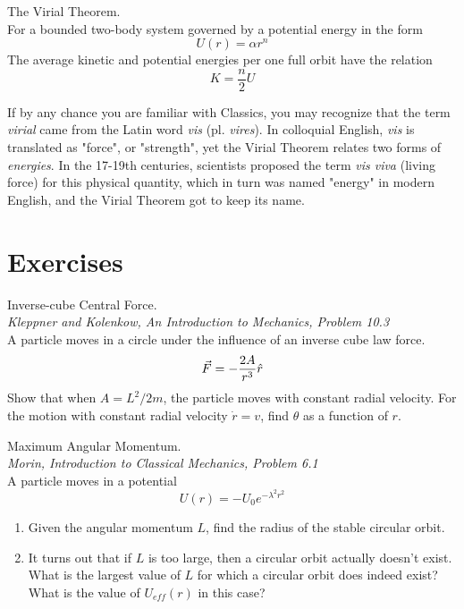 \documentclass[11pt]{article}
\theoremstyle{gangnamstyle}{\newtheorem{definition}{Definition}[]}
\theoremstyle{gangnamstyle}{\newtheorem{example}{Example}[]}
\theoremstyle{gangnamstyle}{\newtheorem{problem}{Problem}[]}
\theoremstyle{gangnamstyle}{\newtheorem{warning}{Warning}[]}
\begin{document}
\begin{definition}
The Virial Theorem. \\
For a bounded two-body system governed by a potential energy in the form
\begin{equation}
U(r) = \alpha r^n
\end{equation}
The average kinetic and potential energies per one full orbit have the relation
\begin{equation}
K = \frac{n}{2}U
\end{equation}
\end{definition}

If by any chance you are familiar with Classics, you may recognize that the term \textit{virial} came from the Latin word \textit{vis} (pl. \textit{vires}). In colloquial English, \textit{vis} is translated as "force", or "strength", yet the Virial Theorem relates two forms of \textit{energies}. In the 17-19th centuries, scientists proposed the term \textit{vis viva} (living force) for this physical quantity, which in turn was named "energy" in modern English, and the Virial Theorem got to keep its name. 

\pagebreak

\section{Exercises}

\begin{problem}
Inverse-cube Central Force. \\
\textit{Kleppner and Kolenkow, An Introduction to Mechanics, Problem 10.3} \\
A particle moves in a circle under the influence of an inverse cube law force.
\[ \Vec{F} = - \frac{2A}{r^3}\Hat{r} \]
Show that when $A = L^2 / 2m$, the particle moves with constant radial velocity. For the motion with constant radial velocity $\Dot{r} = v$, find $\theta$ as a function of $r$. 
\end{problem}

\begin{problem}
Maximum Angular Momentum. \\
\textit{Morin, Introduction to Classical Mechanics, Problem 6.1} \\
A particle moves in a potential 
\[ U(r) = -U_0 e^{-\lambda^2r^2} \]
\begin{enumerate}
\item Given the angular momentum $L$, find the radius of the stable circular orbit. 
\item It turns out that if $L$ is too large, then a circular orbit actually doesn’t exist. What is the largest value of $L$ for which a circular orbit does indeed exist? What is the value of $U_{eff}(r)$ in this case?
\end{enumerate}
\end{problem}
\end{document}
